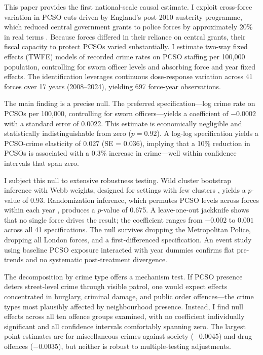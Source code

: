 \documentclass[12pt]{article}
\begin{document}
This paper provides the first national-scale causal estimate. I exploit cross-force variation in PCSO cuts driven by England's post-2010 austerity programme, which reduced central government grants to police forces by approximately 20\% in real terms \citep{hoc2023staffing}. Because forces differed in their reliance on central grants, their fiscal capacity to protect PCSOs varied substantially. I estimate two-way fixed effects (TWFE) models of recorded crime rates on PCSO staffing per 100,000 population, controlling for sworn officer levels and absorbing force and year fixed effects. The identification leverages continuous dose-response variation across 41 forces over 17 years (2008--2024), yielding 697 force-year observations.

The main finding is a precise null. The preferred specification---log crime rate on PCSOs per 100,000, controlling for sworn officers---yields a coefficient of $-0.0002$ with a standard error of 0.0022. This estimate is economically negligible and statistically indistinguishable from zero ($p = 0.92$). A log-log specification yields a PCSO-crime elasticity of 0.027 (SE = 0.036), implying that a 10\% reduction in PCSOs is associated with a 0.3\% increase in crime---well within confidence intervals that span zero.

I subject this null to extensive robustness testing. Wild cluster bootstrap inference with Webb weights, designed for settings with few clusters \citep{cameron2008bootstrap, roodman2019fast}, yields a $p$-value of 0.93. Randomization inference, which permutes PCSO levels across forces within each year \citep{fisher1935design, young2019channeling}, produces a $p$-value of 0.675. A leave-one-out jackknife shows that no single force drives the result; the coefficient ranges from $-0.002$ to $0.001$ across all 41 specifications. The null survives dropping the Metropolitan Police, dropping all London forces, and a first-differenced specification. An event study using baseline PCSO exposure interacted with year dummies confirms flat pre-trends and no systematic post-treatment divergence.

The decomposition by crime type offers a mechanism test. If PCSO presence deters street-level crime through visible patrol, one would expect effects concentrated in burglary, criminal damage, and public order offences---the crime types most plausibly affected by neighbourhood presence. Instead, I find null effects across all ten offence groups examined, with no coefficient individually significant and all confidence intervals comfortably spanning zero. The largest point estimates are for miscellaneous crimes against society ($-0.0045$) and drug offences ($-0.0035$), but neither is robust to multiple-testing adjustments.
\end{document}
